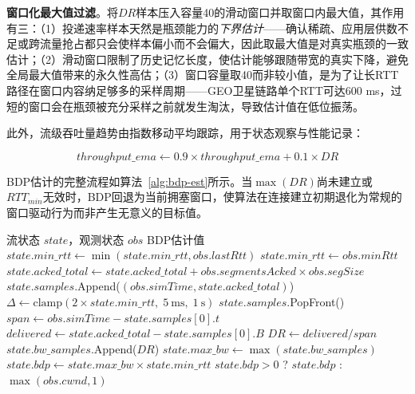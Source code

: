 \textbf{窗口化最大值过滤}。将$DR$样本压入容量40的滑动窗口并取窗口内最大值，其作用有三：（1）投递速率样本天然是瓶颈能力的\emph{下界估计}——确认稀疏、应用层供数不足或跨流量抢占都只会使样本偏小而不会偏大，因此取最大值是对真实瓶颈的一致估计；（2）滑动窗口限制了历史记忆长度，使估计能够跟随带宽的真实下降，避免全局最大值带来的永久性高估；（3）窗口容量取40而非较小值，是为了让长RTT路径在窗口内容纳足够多的采样周期——GEO卫星链路单个RTT可达600 ms，过短的窗口会在瓶颈被充分采样之前就发生淘汰，导致估计值在低位振荡。

此外，流级吞吐量趋势由指数移动平均跟踪，用于状态观察与性能记录：

\begin{equation}
throughput\_ema \leftarrow 0.9 \times throughput\_ema + 0.1 \times DR
\end{equation}

BDP估计的完整流程如算法~\ref{alg:bdp-est}所示。当$\max(DR)$尚未建立或$RTT_{min}$无效时，BDP回退为当前拥塞窗口，使算法在连接建立初期退化为常规的窗口驱动行为而非产生无意义的目标值。

\begin{algorithm}[htbp]
\caption{时间窗口投递速率与BDP估计}
\label{alg:bdp-est}
\begin{algorithmic}[1]
\Require 流状态 $state$，观测状态 $obs$
\Ensure BDP估计值
    \State $state.min\_rtt \leftarrow \min(state.min\_rtt, obs.lastRtt)$
\EndIf
{}
    \State $state.min\_rtt \leftarrow obs.minRtt$
\EndIf
{}
    \State $state.acked\_total \leftarrow state.acked\_total + obs.segmentsAcked \times obs.segSize$
    \State $state.samples$.Append($(obs.simTime, state.acked\_total)$)
    \State $\Delta \leftarrow \mathrm{clamp}(2 \times state.min\_rtt,\; 5~\text{ms},\; 1~\text{s})$
        \State $state.samples$.PopFront()
    \EndWhile
    \State $span \leftarrow obs.simTime - state.samples[0].t$
    \State $delivered \leftarrow state.acked\_total - state.samples[0].B$
        \State $DR \leftarrow delivered / span$
        \State $state.bw\_samples$.Append($DR$) 
        \State $state.max\_bw \leftarrow \max(state.bw\_samples)$
    \EndIf
\EndIf
{}
    \State $state.bdp \leftarrow state.max\_bw \times state.min\_rtt$
\EndIf
\State \Return $state.bdp > 0$ ? $state.bdp$ : $\max(obs.cwnd, 1)$
\end{algorithmic}
\end{algorithm}

